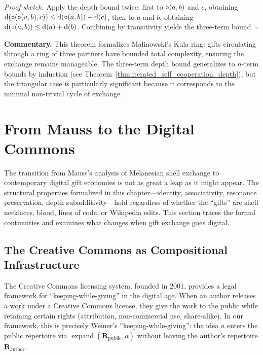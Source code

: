 \noindent\textit{Proof sketch.}\quad
Apply the depth bound twice: first to $\circ(a, b)$ and $c$, obtaining
$\operatorname{d}(\circ(\circ(a,b), c)) \leq \operatorname{d}(\circ(a,b)) + \operatorname{d}(c)$,
then to $a$ and $b$, obtaining $\operatorname{d}(\circ(a,b)) \leq \operatorname{d}(a) +
\operatorname{d}(b)$.  Combining by transitivity yields the three-term bound.
\hfill$\square$

\medskip

\noindent\textbf{Commentary.}
This theorem formalizes Malinowski's Kula ring: gifts circulating through a
ring of three partners have bounded total complexity, ensuring the exchange
remains manageable.  The three-term depth bound generalizes to $n$-term
bounds by induction (see Theorem~\ref{thm:iterated_self_cooperation_depth}),
but the triangular case is particularly significant because it corresponds
to the minimal non-trivial cycle of exchange.

\section{From Mauss to the Digital Commons}
\label{sec:ch16-digital-commons}

The transition from Mauss's analysis of Melanesian shell exchange to
contemporary digital gift economies is not as great a leap as it might
appear.  The structural properties formalized in this chapter---identity,
associativity, resonance preservation, depth subadditivity---hold
regardless of whether the ``gifts'' are shell necklaces, blood, lines
of code, or Wikipedia edits.  This section traces the formal continuities
and examines what changes when gift exchange goes digital.

\subsection{The Creative Commons as Compositional Infrastructure}

The Creative Commons licensing system, founded in 2001, provides a
legal framework for ``keeping-while-giving'' in the digital age.  When
an author releases a work under a Creative Commons license, they give
the work to the public while retaining certain rights (attribution,
non-commercial use, share-alike).  In our framework, this is precisely
Weiner's ``keeping-while-giving'': the idea $a$ enters the public
repertoire via $\operatorname{expand}(\mathbf{R}_{\text{public}}, a)$
without leaving the author's repertoire
$\mathbf{R}_{\text{author}}$.

